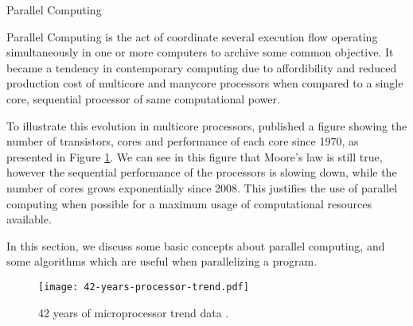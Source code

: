 \begin{section}{Parallel Computing}\label{sec:parallel_computing}
\label{sec:parallel_comp}

	Parallel Computing is the act of coordinate several execution
flow operating simultaneously in one or more computers to archive
some common objective. It became a tendency in contemporary computing
due to affordibility and reduced production cost of multicore
and manycore processors when compared to a single core, sequential
processor of same computational power.


To illustrate this evolution in multicore processors, \cite{42years}
published a figure showing the number of transistors, cores and
performance of each core since 1970, as presented in Figure
\ref{fig:42years}. We can see in this figure that Moore's law
is still true, however the sequential performance of the processors
is slowing down, while the number of cores grows exponentially
since 2008. This justifies the use of parallel computing when possible
for a maximum usage of computational resources available.



In this section, we discuss some basic concepts about parallel computing,
and some algorithms which are useful when parallelizing a program.


\begin{figure}[ht]
 \centering
 \texttt{[image: 42-years-processor-trend.pdf]}
 \caption{42 years of microprocessor trend data \citep{42years}.}
 \label{fig:42years}
\end{figure}


\end{section}
